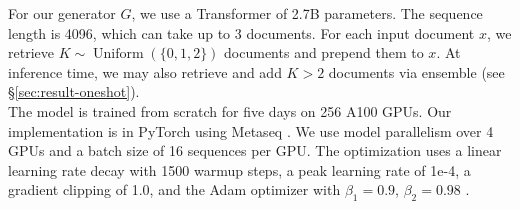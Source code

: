 For our generator $G$, we use a Transformer \cite{vaswani2017attention} of 2.7B parameters. The sequence length is 4096, which can take up to 3 documents. For each input document $x$, we retrieve $K \sim \operatorname{Uniform}(\{0,1,2\})$ documents and prepend them to $x$. At inference time, we may also retrieve and add $K\!>\!2$ documents via ensemble (see \S \ref{sec:result-oneshot}).\\[0.8mm]
The model is trained from scratch for five days on 256 A100 GPUs.
Our implementation is in PyTorch \citep{pytorch} using Metaseq \citep{zhang2022opt}. We use model parallelism over 4 GPUs and a batch size of 16 sequences per GPU. The optimization uses a linear learning rate decay with 1500 warmup steps, a peak learning rate of 1e-4, a gradient clipping of 1.0, and the Adam optimizer with $\beta_1=0.9$, $\beta_2=0.98$ \citep{kingma2015adam}.


